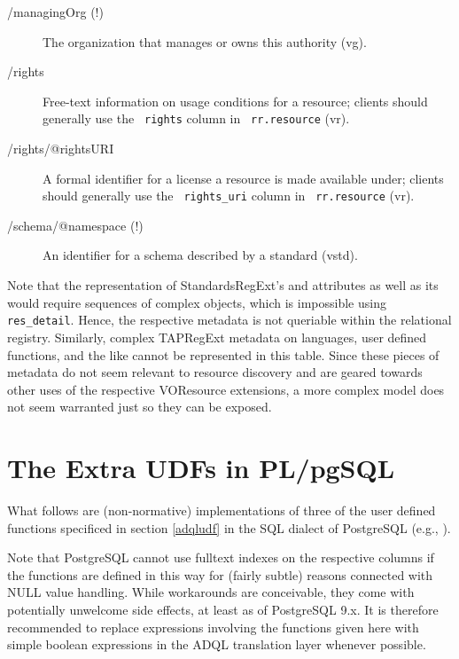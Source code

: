 \documentclass[11pt,a4paper]{ivoa}
\newcommand{\rtent}[1]{\texttt{\color{rtcolor} #1}}
\begin{document}
\begin{description}
\item[/managingOrg (!)]The organization that manages or owns this authority (vg).
\item[/rights]Free-text information on usage conditions for a resource;
clients should generally use the \rtent{rights} column in
\rtent{rr.resource} (vr).
\item[/rights/@rightsURI]A formal identifier for a license a
resource is made available under; clients should generally use the
\rtent{rights\_uri} column in \rtent{rr.resource} (vr).
\item[/schema/@namespace (!)]An identifier for a schema described by a standard (vstd).

\end{description}

Note that the representation of StandardsRegExt's 
  and 
attributes as well as its  would require sequences of
complex objects, which is impossible using \rtent{res\_detail}.
Hence, the respective metadata is not queriable
within the relational registry. Similarly, complex TAPRegExt metadata on
languages, user defined functions, and the like cannot be
represented in this table.  Since these pieces of metadata do not seem
relevant to resource discovery and are geared towards other uses of the
respective VOResource extensions, a more complex model does not seem
warranted just so they can be exposed.



\section{The Extra UDFs in
PL/pgSQL}

\label{appPGDefs}

What follows are (non-normative) 
implementations of three of the user defined functions
specificed in section \ref{adqludf} in the SQL dialect
of PostgreSQL (e.g., \citet{doc:Postgres92}).

Note that PostgreSQL cannot use fulltext indexes on the respective
columns if the functions are defined in this way for (fairly subtle)
reasons connected with NULL value handling.  While workarounds are
conceivable, they come with potentially unwelcome side effects, at least
as of PostgreSQL 9.x.  It is therefore recommended to replace
expressions involving the functions given here with simple boolean
expressions in the ADQL translation layer whenever possible.
\end{document}
